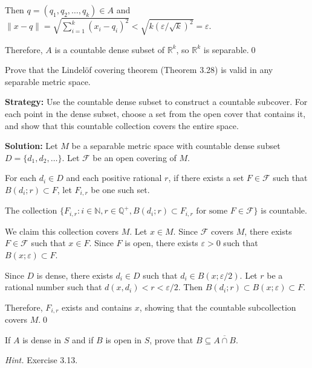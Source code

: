 Then $q = (q_1, q_2, \ldots, q_k) \in A$ and $\|x - q\| = \sqrt{\sum_{i=1}^k (x_i - q_i)^2} < \sqrt{k(\varepsilon/\sqrt{k})^2} = \varepsilon$.

Therefore, $A$ is a countable dense subset of $\mathbb{R}^k$, so $\mathbb{R}^k$ is separable.\qed


\begin{problembox}
\begin{problemstatement}
Prove that the Lindelöf covering theorem (Theorem 3.28) is valid in any separable metric space.
\end{problemstatement}
\end{problembox}

\noindent\textbf{Strategy:} Use the countable dense subset to construct a countable subcover. For each point in the dense subset, choose a set from the open cover that contains it, and show that this countable collection covers the entire space.

\bigskip\noindent\textbf{Solution:} Let $M$ be a separable metric space with countable dense subset $D = \{d_1, d_2, \ldots\}$. Let $\mathcal{F}$ be an open covering of $M$.

For each $d_i \in D$ and each positive rational $r$, if there exists a set $F \in \mathcal{F}$ such that $B(d_i;r) \subset F$, let $F_{i,r}$ be one such set.

The collection $\{F_{i,r} : i \in \mathbb{N}, r \in \mathbb{Q}^+, B(d_i;r) \subset F_{i,r} \text{ for some } F \in \mathcal{F}\}$ is countable.

We claim this collection covers $M$. Let $x \in M$. Since $\mathcal{F}$ covers $M$, there exists $F \in \mathcal{F}$ such that $x \in F$. Since $F$ is open, there exists $\varepsilon > 0$ such that $B(x;\varepsilon) \subset F$.

Since $D$ is dense, there exists $d_i \in D$ such that $d_i \in B(x;\varepsilon/2)$. Let $r$ be a rational number such that $d(x,d_i) < r < \varepsilon/2$. Then $B(d_i;r) \subset B(x;\varepsilon) \subset F$.

Therefore, $F_{i,r}$ exists and contains $x$, showing that the countable subcollection covers $M$.\qed


\begin{problembox}
\begin{problemstatement}
If \( A \) is dense in \( S \) and if \( B \) is open in \( S \), prove that \( B \subseteq \overline{A \cap B} \).

\textit{Hint.} Exercise 3.13.
\end{problemstatement}
\end{problembox}

